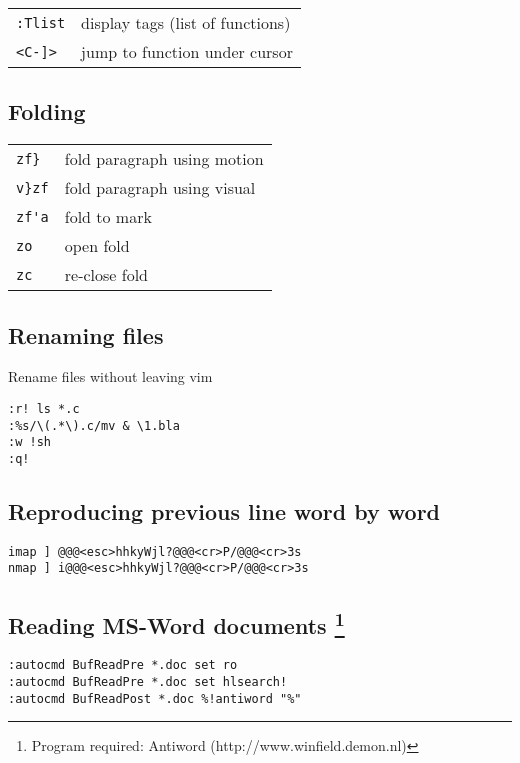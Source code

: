 \begin{center}
\begin{longtable}{l|l}
\verb!:Tlist! & display tags (list of functions)\\
\verb!<C-]> ! & jump to function under cursor
\end{longtable}
\end{center}

\subsection{Folding}
\begin{center}
\begin{longtable}{l|l}
 \verb!zf}! & fold paragraph using motion\\
 \verb!v}zf! & fold paragraph using visual\\
 \verb!zf'a! & fold to mark\\
 \verb!zo! & open fold\\
 \verb!zc! & re-close fold
\end{longtable}
\end{center}

\subsection{Renaming files}
Rename files without leaving vim
\begin{verbatim}
:r! ls *.c
:%s/\(.*\).c/mv & \1.bla
:w !sh
:q!
\end{verbatim}

\subsection{Reproducing previous line word by word}

\begin{verbatim}
imap ] @@@<esc>hhkyWjl?@@@<cr>P/@@@<cr>3s
nmap ] i@@@<esc>hhkyWjl?@@@<cr>P/@@@<cr>3s
\end{verbatim}

\subsection[Reading MS-Word documents]
{Reading MS-Word documents \footnote{Program required: Antiword (http://www.winfield.demon.nl)}}

\begin{verbatim}
:autocmd BufReadPre *.doc set ro
:autocmd BufReadPre *.doc set hlsearch!
:autocmd BufReadPost *.doc %!antiword "%"
\end{verbatim}

